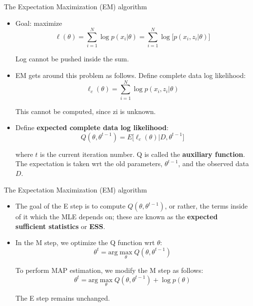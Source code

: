 \documentclass[10pt,mathserif]{beamer}
\begin{document}
\begin{frame}{The Expectation Maximization (EM) algorithm}
\begin{itemize}
    \item Goal: maximize
    \begin{equation}
        \ell(\theta) = \sum_{i=1}^N\log p(x_i|\theta) = \sum_{i=1}^N\log \bigg[p(x_i,z_i|\theta) \bigg]
    \end{equation}
    
    Log cannot be pushed inside the sum.
    
    \item EM gets around this problem as follows. Define complete data log likelihood:
    \begin{equation}
        \ell_c(\theta) = \sum_{i=1}^N\log p(x_i,z_i|\theta)
    \end{equation}
    
    This cannot be computed, since zi is unknown.
    
    \item Define \textbf{expected complete data log likelihood}:
    \begin{equation}
        Q(\theta, \theta^{t-1}) =  E \bigg[ \ell_c (\theta) |D, \theta^{t-1} \bigg]
    \end{equation}
    
    where $t$ is the current iteration number. Q is called the \textbf{auxiliary function}. The expectation is taken wrt the old parameters, $\theta^{t-1}$, and the observed data $D$.
\end{itemize}
\end{frame}

\begin{frame}{The Expectation Maximization (EM) algorithm}
\begin{itemize}
    \item The goal of the E step is to compute $Q(\theta, \theta^{t-1})$, or rather, the terms inside of it which the MLE depends on; these are known as the \textbf{expected sufficient statistics} or \textbf{ESS}.
    \item In the M step, we optimize the Q function wrt $\theta$:
    \begin{equation}
        \theta^t  = \text{arg}\max_\theta Q(\theta, \theta^{t-1})
    \end{equation}
    
    To perform MAP estimation, we modify the M step as follows:
    \begin{equation}
        \theta^t  = \text{arg}\max_\theta Q(\theta, \theta^{t-1}) + \log p(\theta)
    \end{equation}
    
    The E step remains unchanged.
\end{itemize}
\end{frame}
\end{document}
